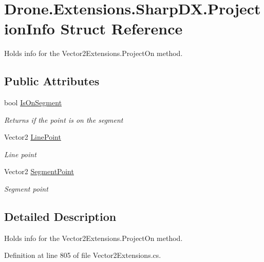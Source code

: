 \hypertarget{struct_drone_1_1_extensions_1_1_sharp_d_x_1_1_projection_info}{}\section{Drone.\+Extensions.\+Sharp\+D\+X.\+Projection\+Info Struct Reference}
\label{struct_drone_1_1_extensions_1_1_sharp_d_x_1_1_projection_info}


Holds info for the Vector2\+Extensions.\+Project\+On method.  


\subsection*{Public Attributes}
\begin{DoxyCompactItemize}
\item 
bool \hyperlink{struct_drone_1_1_extensions_1_1_sharp_d_x_1_1_projection_info_afcf63effd0d95d285a22117b102cc113}{Is\+On\+Segment}
\begin{DoxyCompactList}\small\item\em Returns if the point is on the segment \end{DoxyCompactList}\item 
Vector2 \hyperlink{struct_drone_1_1_extensions_1_1_sharp_d_x_1_1_projection_info_a77bfbc341a80e373f38f88d2fa3e865f}{Line\+Point}
\begin{DoxyCompactList}\small\item\em Line point \end{DoxyCompactList}\item 
Vector2 \hyperlink{struct_drone_1_1_extensions_1_1_sharp_d_x_1_1_projection_info_aca88a5f469770c319998dbbbb59b4e8c}{Segment\+Point}
\begin{DoxyCompactList}\small\item\em Segment point \end{DoxyCompactList}\end{DoxyCompactItemize}


\subsection{Detailed Description}
Holds info for the Vector2\+Extensions.\+Project\+On method. 



Definition at line 805 of file Vector2\+Extensions.\+cs.



